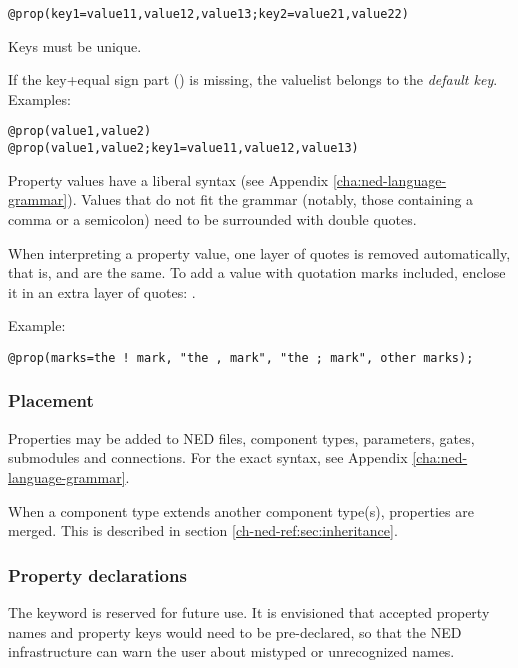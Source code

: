 \begin{verbatim}
@prop(key1=value11,value12,value13;key2=value21,value22)
\end{verbatim}

Keys must be unique.

If the key+equal sign part () is missing, the valuelist belongs
to the \textit{default key}. Examples:

\begin{verbatim}
@prop(value1,value2)
@prop(value1,value2;key1=value11,value12,value13)
\end{verbatim}

Property values have a liberal syntax (see Appendix \ref{cha:ned-language-grammar}).
Values that do not fit the grammar (notably, those containing a comma or
a semicolon) need to be surrounded with double quotes.

When interpreting a property value, one layer of quotes is removed
automatically, that is,  and  are the same. To add a
value with quotation marks included, enclose it in an extra layer of
quotes: .

Example:

\begin{verbatim}
@prop(marks=the ! mark, "the , mark", "the ; mark", other marks);
\end{verbatim}


\subsubsection{Placement}

Properties may be added to NED files, component types, parameters,
gates, submodules and connections. For the exact syntax, see
Appendix \ref{cha:ned-language-grammar}.

When a component type extends another component type(s), properties
are merged. This is described in section \ref{ch-ned-ref:sec:inheritance}.


\subsubsection{Property declarations}

The  keyword is reserved for future use. It is
envisioned that accepted property names and property keys would need
to be pre-declared, so that the NED infrastructure can warn the user
about mistyped or unrecognized names.


